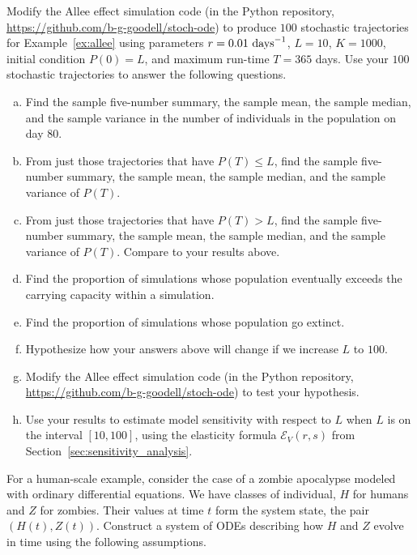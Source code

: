 \begin{exercises}
\item \label{ex:hw_allee_stochastic}
Modify the Allee effect simulation code (in the Python repository, \url{https://github.com/b-g-goodell/stoch-ode}) to produce $100$ stochastic trajectories for Example~\ref{ex:allee} using parameters $r=0.01\textup{ days}^{-1}$, $L=10$, $K=1000$, initial condition $P(0) = L$, and maximum run-time $T = 365$ days. Use your $100$ stochastic trajectories to answer the following questions.
\begin{enumerate}[(a)]
\item Find the sample five-number summary, the sample mean, the sample median, and the sample variance in the number of individuals in the population on day $80$.
\item From just those trajectories that have $P(T) \leq L$, find the sample five-number summary, the sample mean, the sample median, and the sample variance of $P(T)$.
\item From just those trajectories that have $P(T) > L$, find the sample five-number summary, the sample mean, the sample median, and the sample variance of $P(T)$. Compare to your results above.
\item Find the proportion of simulations whose population eventually exceeds the carrying capacity within a simulation.
\item Find the proportion of simulations whose population go extinct.
\item Hypothesize how your answers above will change if we increase $L$ to $100$.
\item Modify the Allee effect simulation code (in the Python repository, \url{https://github.com/b-g-goodell/stoch-ode}) to test your hypothesis.
\item Use your results to estimate model sensitivity with respect to $L$ when $L$ is on the interval $[10, 100]$, using the elasticity formula $\mathcal{E}_{V}(r,s)$ from Section~\ref{sec:sensitivity_analysis}.
\end{enumerate}


\item \label{ex:hw_zombie}
For a human-scale example, consider the case of a zombie apocalypse modeled with ordinary differential equations. We have classes of individual, $H$ for humans and $Z$ for zombies. Their values at time $t$ form the system state, the pair $(H(t), Z(t))$. Construct a system of ODEs describing how $H$ and $Z$ evolve in time using the following assumptions.


\end{exercises}
